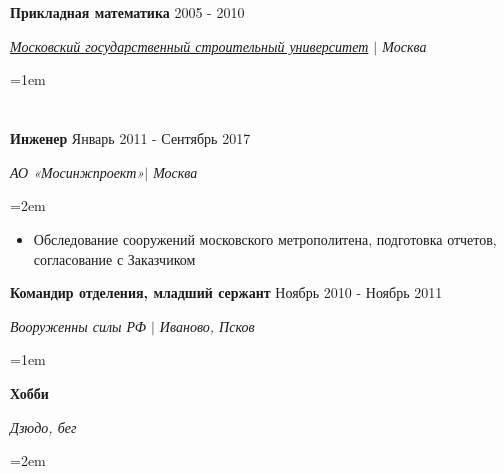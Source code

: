 \documentclass{article}
\newcommand{\NewPart}[1]{\section*{{\color{gray}{#1}}}}
\newcommand{\ExperienceEntry}[4]{
		\noindent \textbf{#1} \hfill  
		\hfill #2 \par  %
		\noindent \textit{#3} \par        %
\noindent  \text   \par    
		\noindent\hangindent=1em\hangafter=0 #4 %
		\normalsize \par}
\newcommand{\Other}[4]{
		\noindent \textbf{#1} \hfill  
		\hfill #2 \par  %
		\noindent \textit{#3} \par        %
		\noindent\hangindent=2em\hangafter=0  #4 %
		\normalsize \par}
\begin{document}
{}


\NewPart{Образование}{}

\ExperienceEntry
{Прикладная математика}
{2005 - 2010}
{\href{https://mgsu.ru/}
{Московский государственный строительный университет} $\vert$ Москва}
{}

        

\NewPart{Дополнительно }{}
{	

\Other
{Инженер}
{Январь 2011 - Сентябрь 2017}
{АО  «Мосинжпроект»$\vert$ Москва}
{	
\begin{itemize}
	\item{Обследование сооружений московского метрополитена, подготовка отчетов, согласование с Заказчиком}
\end{itemize}
}

\ExperienceEntry
{Командир отделения, младший сержант}
{Ноябрь 2010 - Ноябрь 2011}
{Вооруженны силы РФ $\vert$ Иваново, Псков}
{	

\Other
{Хобби}
{ }
{Дзюдо, бег}


}
}
\end{document}

